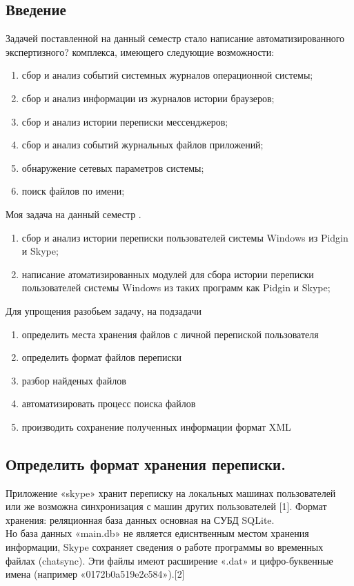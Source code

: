 \newpage

\subsection{Введение}

Задачей поставленной на данный семестр стало написание автоматизированного экспертизного? комплекса, имеющего следующие возможности: 

\begin{enumerate}
\item сбор и анализ событий системных журналов операционной системы;
\item сбор и анализ информации из журналов истории браузеров;
\item сбор и анализ истории переписки мессенджеров;
\item сбор и анализ событий журнальных файлов приложений;
\item обнаружение сетевых параметров системы;
\item поиск файлов по имени;
\end{enumerate}

Моя задача на данный семестр . 

\begin{enumerate}
\item сбор и анализ истории переписки пользователей системы Windows из Pidgin и Skype;
\item написание атоматизированных модулей для сбора истории переписки пользователей системы Windows из таких программ как Pidgin и Skype;
\end{enumerate}

Для упрощения разобьем задачу, на подзадачи
\begin{enumerate}
\item определить места хранения файлов с личной перепиской пользователя
\item определить формат файлов переписки
\item разбор найденых файлов
\item автоматизировать процесс поиска файлов
\item производить сохранение полученных информации формат XML
\end{enumerate}

\subsection{Определить формат хранения переписки.}

Приложение «skype» хранит переписку на локальных машинах пользователей или же возможна синхронизация с машин других пользователей [1]. Формат хранения: реляционная база данных основная на СУБД SQLite.\\ 
Но база данных «main.db» не является едиснтвенным местом хранения информации, Skype сохраняет сведения о работе программы во временных файлах (chatsync). Эти файлы имеют расширение «.dat» и цифро-буквенные имена (например «0172b0a519e2c584»).[2]

